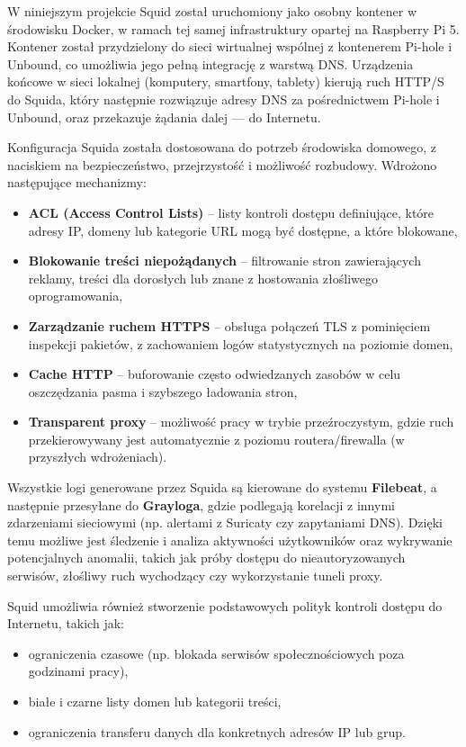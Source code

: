 \documentclass[
    left=2.5cm,         %
    right=2.5cm,        %
    top=2.5cm,          %
    bottom=3cm,         %
    bindingoffset=6mm,  %
    nohyphenation=true %
]{eiti/eiti-thesis} %
\begin{document}
W niniejszym projekcie Squid został uruchomiony jako osobny kontener w środowisku Docker, w ramach tej samej infrastruktury opartej na Raspberry Pi 5. Kontener został przydzielony do sieci wirtualnej wspólnej z kontenerem Pi-hole i Unbound, co umożliwia jego pełną integrację z warstwą DNS. Urządzenia końcowe w sieci lokalnej (komputery, smartfony, tablety) kierują ruch HTTP/S do Squida, który następnie rozwiązuje adresy DNS za pośrednictwem Pi-hole i Unbound, oraz przekazuje żądania dalej — do Internetu.

Konfiguracja Squida została dostosowana do potrzeb środowiska domowego, z naciskiem na bezpieczeństwo, przejrzystość i możliwość rozbudowy. Wdrożono następujące mechanizmy:
\begin{itemize}
    \item \textbf{ACL (Access Control Lists)} – listy kontroli dostępu definiujące, które adresy IP, domeny lub kategorie URL mogą być dostępne, a które blokowane,
    \item \textbf{Blokowanie treści niepożądanych} – filtrowanie stron zawierających reklamy, treści dla dorosłych lub znane z hostowania złośliwego oprogramowania,
    \item \textbf{Zarządzanie ruchem HTTPS} – obsługa połączeń TLS z pominięciem inspekcji pakietów, z zachowaniem logów statystycznych na poziomie domen,
    \item \textbf{Cache HTTP} – buforowanie często odwiedzanych zasobów w celu oszczędzania pasma i szybszego ładowania stron,
    \item \textbf{Transparent proxy} – możliwość pracy w trybie przeźroczystym, gdzie ruch przekierowywany jest automatycznie z poziomu routera/firewalla (w przyszłych wdrożeniach).
\end{itemize}

Wszystkie logi generowane przez Squida są kierowane do systemu \textbf{Filebeat}, a następnie przesyłane do \textbf{Grayloga}, gdzie podlegają korelacji z innymi zdarzeniami sieciowymi (np. alertami z Suricaty czy zapytaniami DNS). Dzięki temu możliwe jest śledzenie i analiza aktywności użytkowników oraz wykrywanie potencjalnych anomalii, takich jak próby dostępu do nieautoryzowanych serwisów, złośliwy ruch wychodzący czy wykorzystanie tuneli proxy.

Squid umożliwia również stworzenie podstawowych polityk kontroli dostępu do Internetu, takich jak:
\begin{itemize}
    \item ograniczenia czasowe (np. blokada serwisów społecznościowych poza godzinami pracy),
    \item białe i czarne listy domen lub kategorii treści,
    \item ograniczenia transferu danych dla konkretnych adresów IP lub grup.
\end{itemize}
\end{document}
